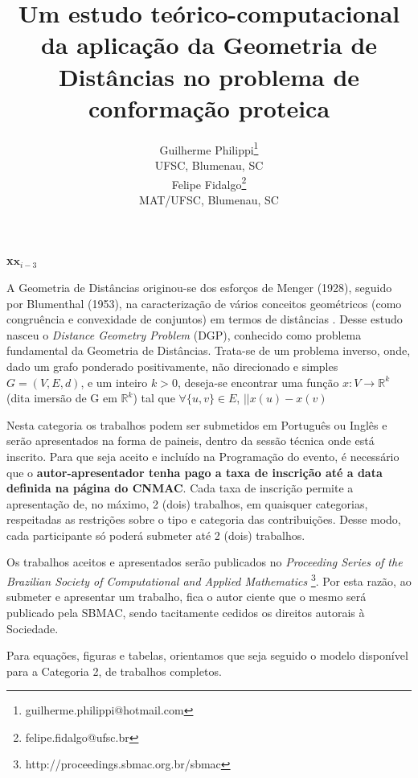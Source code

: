 \documentclass[a4,11pt]{pssbmac}
\begin{document}
	
	\title{Um estudo teórico-computacional da aplicação da Geometria de Distâncias no problema de conformação proteica}
	
	\author{
		{\large Guilherme Philippi}\thanks{guilherme.philippi@hotmail.com}\\
		{\small UFSC, Blumenau, SC} \\
		{\large Felipe Fidalgo}\thanks{felipe.fidalgo@ufsc.br} \\
		{\small MAT/UFSC, Blumenau, SC} \\
	}
	\criartitulo
	
	\textbf{x}$\mathbf{x}_{i-3}$
	
	A Geometria de Distâncias originou-se dos esforços de Menger (1928), seguido por Blumenthal (1953), na caracterização de vários conceitos geométricos (como congruência e convexidade de conjuntos) em termos de distâncias \cite{carlileGDandAplications}. Desse estudo nasceu o \textit{Distance Geometry Problem} (DGP), conhecido como problema fundamental da Geometria de Distâncias. Trata-se de um problema inverso, onde, dado um grafo ponderado positivamente, não direcionado e simples $G=(V,E, d)$, e um inteiro $k>0$, deseja-se encontrar uma função $x:V\rightarrow\mathbb{R}^k$ (dita imersão de G em $\mathbb{R}^k$) tal que $\forall \{u,v\} \in E$, $||x(u) - x(v)$
	
	Nesta categoria os trabalhos podem ser submetidos em Português ou Inglês e serão apresentados na forma de paineis, dentro da sessão técnica onde está inscrito. Para que seja aceito e incluído na Programação do evento, é necessário que o {\bf autor-apresentador tenha pago a taxa de inscrição até a data definida na página do CNMAC}. Cada taxa de inscrição permite a apresentação de, no máximo, 2 (dois) trabalhos, em quaisquer categorias, respeitadas as restrições sobre o tipo e categoria das contribuições. Desse modo, cada participante só poderá submeter até 2 (dois) trabalhos.
	
	Os trabalhos aceitos e apresentados serão publicados no {\it Proceeding Series of the Brazilian Society of Computational and Applied Mathematics} \footnote{http://proceedings.sbmac.org.br/sbmac}. Por esta razão, ao submeter e apresentar um trabalho, fica o autor ciente que o mesmo será publicado pela SBMAC, sendo tacitamente cedidos os direitos autorais à Sociedade.
	
	Para equações, figuras e tabelas, orientamos que seja seguido o modelo disponível para a Categoria 2, de trabalhos completos.
	
\end{document}
